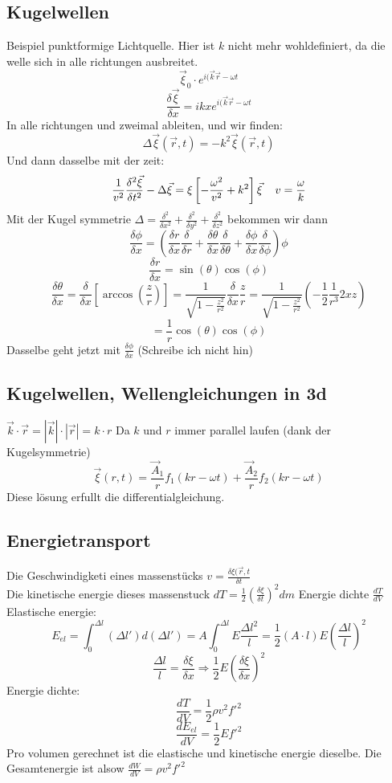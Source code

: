 \documentclass{article}
\newcommand{\mspc}{\hspace{0.4cm}}
\begin{document}
\subsection{Kugelwellen}
Beispiel punktformige Lichtquelle. Hier ist $k$ nicht mehr wohldefiniert, da die welle sich in alle richtungen ausbreitet.
\[\vec{\xi}_0\cdot e^{i(\vec{k}\vec{r}-\omega t}\]
\[\frac{\delta \vec{\xi}}{\delta x}=ikxe^{i(\vec{k}\vec{r}- \omega t}\]
In alle richtungen und zweimal ableiten, und wir finden:
\[\Delta\vec{\xi}(\vec{r},t)=-k^2\vec{\xi}(\vec{r},t)\]
Und dann dasselbe mit der zeit:
\[\frac{1}{v^2}\frac{\delta^2\vec{\xi}}{\delta t^2}-\Delta\vec{\xi}=\xi\left[-\frac{\omega^2}{v^2}+k^2\right]\vec{\xi}\mspc v=\frac{\omega}{k}\]
Mit der Kugel symmetrie $\Delta = \frac{\delta^2}{\delta x^2}+\frac{\delta^2}{\delta y^2}+\frac{\delta^2}{\delta z^2}$
bekommen wir dann 
\[\frac{\delta \phi}{\delta x}=\left(\frac{\delta r}{\delta x}\frac{\delta}{\delta r}+\frac{\delta \theta}{\delta x}\frac{\delta}{\delta \theta}+\frac{\delta \phi}{\delta x}\frac{\delta}{\delta \phi}\right)\phi\]
\[\frac{\delta r}{\delta x}=\sin(\theta)\cos(\phi)\]
\[\frac{\delta\theta}{\delta x}=\frac{\delta}{\delta x}\left[\arccos\left(\frac{z}{r}\right)\right]=\frac{1}{\sqrt{1-\frac{z^2}{r^2}}}\frac{\delta}{\delta x}\frac{z}{r}=\frac{1}{\sqrt{1-\frac{z^2}{r^2}}}\left(-\frac{1}{2}\frac{1}{r^3}2xz\right)\]
\[=\frac{1}{r}\cos(\theta)\cos(\phi)\]
Dasselbe geht jetzt mit $\frac{\delta \phi}{\delta x}$ (Schreibe ich nicht hin)
\subsection{Kugelwellen, Wellengleichungen in 3d}$\vec{k}\cdot\vec{r}= |\vec{k}|\cdot|\vec{r}|=k\cdot r$ Da $k$ und $r$ immer parallel laufen (dank der Kugelsymmetrie)
\[\vec{\xi}(r,t)=\frac{\vec{A}_1}{r}f_1(kr-\omega t)+\frac{\vec{A}_2}{r}f_2(kr-\omega t)\]
Diese lösung erfullt die differentialgleichung.
\subsection{Energietransport} Die Geschwindigketi eines massenstücks $v=\frac{\delta \xi(\vec{r},t}{\delta t}$\\
Die kinetische energie dieses massenstuck $dT=\frac{1}{2}\left(\frac{\delta \xi}{\delta t}\right)^2 dm$
Energie dichte $\frac{dT}{dV}$
\\
Elastische energie:
\[E_{el}=\int_0^{\Delta l}(\Delta l')d(\Delta l')=A\int_0^{\Delta l}E\frac{\Delta l^2}{l}=\frac{1}{2}(A\cdot l)E\left(\frac{\Delta l}{l}\right)^2\]
\[\frac{\Delta l}{l}=\frac{\delta \xi}{\delta x}\Rightarrow\frac{1}{2}E\left(\frac{\delta \xi}{\delta x}\right)^2\]
Energie dichte:
\[\frac{dT}{dV}=\frac{1}{2}\rho v^2 f'^2\]
\[\frac{dE_{el}}{dV}=\frac{1}{2}Ef'^2\]
Pro volumen gerechnet ist die elastische und kinetische energie dieselbe. Die Gesamtenergie ist alsow $\frac{dW}{dV}=\rho v^2f'^2$\\
\end{document}
